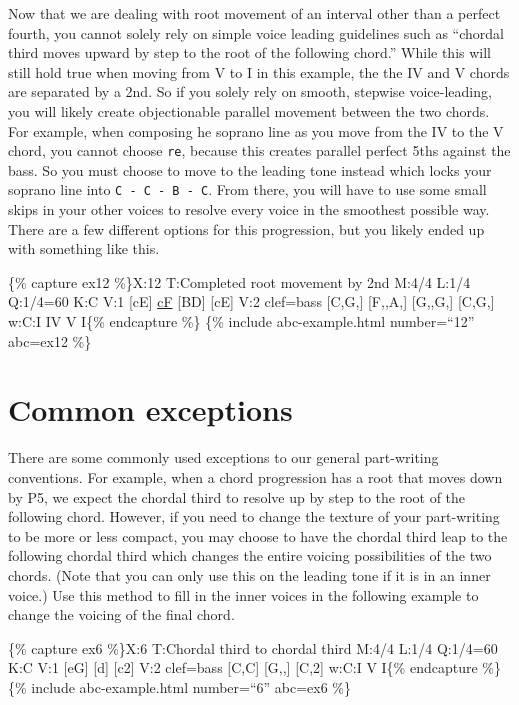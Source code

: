 \documentclass{book}
\begin{document}
Now that we are dealing with root movement of an interval other than a perfect
fourth, you cannot solely rely on simple voice leading guidelines such as
``chordal third moves upward by step to the root of the following chord.''
While this will still hold true when moving from V to I in this example, the
the IV and V chords are separated by a 2nd. So if you solely rely on smooth,
stepwise voice-leading, you will likely create objectionable parallel movement
between the two chords. For example, when composing he soprano line as you
move from the IV to the V chord, you cannot choose \texttt{re}, because this
creates parallel perfect 5ths against the bass. So you must choose to move to
the leading tone instead which locks your soprano line into
\texttt{C\ -\ C\ -\ B\ -\ C}. From there, you will have to use some small
skips in your other voices to resolve every voice in the smoothest possible
way. There are a few different options for this progression, but you likely
ended up with something like this.

\{\% capture ex12 \%\}X:12 T:Completed root movement by 2nd M:4/4 L:1/4
Q:1/4=60 K:C V:1 {[}cE{]} \href{cantusFirmus.html}{cF} {[}BD{]}
{[}cE{]}\textbar{]} V:2 clef=bass {[}C,G,{]} {[}F,,A,{]} {[}G,,G,{]}
{[}C,G,{]}\textbar{]} w:C:I IV V I\{\% endcapture \%\} \{\% include
abc-example.html number=``12'' abc=ex12 \%\}

\hypertarget{common-exceptions}{%
\section{Common exceptions}\label{common-exceptions}}

There are some commonly used exceptions to our general part-writing
conventions. For example, when a chord progression has a root that moves down
by P5, we expect the chordal third to resolve up by step to the root of the
following chord. However, if you need to change the texture of your
part-writing to be more or less compact, you may choose to have the chordal
third leap to the following chordal third which changes the entire voicing
possibilities of the two chords. (Note that you can only use this on the
leading tone if it is in an inner voice.) Use this method to fill in the inner
voices in the following example to change the voicing of the final chord.

\{\% capture ex6 \%\}X:6 T:Chordal third to chordal third M:4/4 L:1/4 Q:1/4=60
K:C V:1 {[}eG{]} {[}d{]} {[}c2{]}\textbar{]} V:2 clef=bass {[}C,C{]} {[}G,,{]}
{[}C,2{]}\textbar{]} w:C:I V I\{\% endcapture \%\} \{\% include
abc-example.html number=``6'' abc=ex6 \%\}
\end{document}
